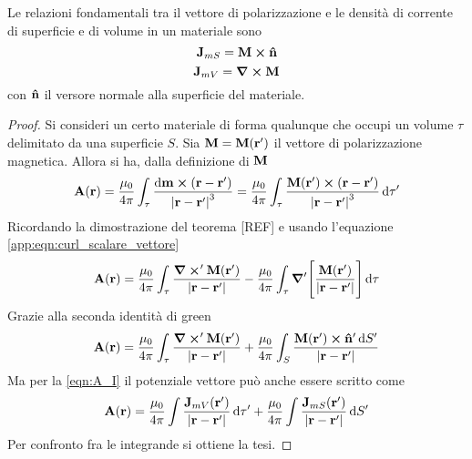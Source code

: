 \begin{thm}
    Le relazioni fondamentali tra il vettore di polarizzazione e le densità di corrente
    di superficie e di volume in un materiale sono
    \begin{equation}
        \vb{J}_{mS}=\vb{M}\cp\vu{n}
        \label{eqn:M_JmS}
    \end{equation}
    \begin{equation}
        \vb{J}_{mV}=\curl{\vb{M}}
        \label{eqn:M_JmV}
    \end{equation}
    con $\vu{n}$ il versore normale alla superficie del materiale.
\end{thm}
\begin{proof}
    Si consideri un certo materiale di forma qualunque che occupi un volume $\tau$ delimitato da una superficie $S$.
    Sia $\vb{M}=\vb{M}(\vb{r}')$ il vettore di polarizzazione magnetica. Allora si ha, dalla definizione di $\vb{M}$
    \[
        \vb{A}(\vb{r})=\frac{\mu_0}{4\pi} \int_{\tau}\frac{\dd{\vb{m}}\cp(\vb{r}-\vb{r'})}{\abs{\vb{r}-\vb{r'}}^3}=
        \frac{\mu_0}{4\pi} \int_{\tau}\frac{\vb{M}(\vb{r'})\cp(\vb{r}-\vb{r'})}{\abs{\vb{r}-\vb{r'}}^3}\dd{\tau'}
    \]
    Ricordando la dimostrazione del teorema [REF] e usando l'equazione \eqref{app:eqn:curl_scalare_vettore}
    \[
        \vb{A}(\vb{r})=\frac{\mu_0}{4\pi} \int_{\tau}\frac{\curl'\vb{M}(\vb{r'})}{\abs{\vb{r}-\vb{r'}}}-
        \frac{\mu_0}{4\pi} \int_{\tau}\grad'\Biggl[\frac{\vb{M}(\vb{r'})}{\abs{\vb{r}-\vb{r'}}}\Biggr]\dd{\tau}
    \]
    Grazie alla seconda identità di green
    \[
        \vb{A}(\vb{r})=\frac{\mu_0}{4\pi} \int_{\tau}\frac{\curl'\vb{M}(\vb{r'})}{\abs{\vb{r}-\vb{r'}}}+
        \frac{\mu_0}{4\pi} \int_{S}\frac{\vb{M}(\vb{r'})\cp\vu{n}'\dd{S'}}{\abs{\vb{r}-\vb{r'}}}
    \]
    Ma per la \ref{eqn:A_I} il potenziale vettore può anche essere scritto come
    \[
        \vb{A}(\vb{r})=\frac{\mu_0}{4\pi}\int\frac{\vb{J}_{mV}(\vb{r}')}{\abs{\vb{r}-\vb{r}'}}\dd{\tau'}+
        \frac{\mu_0}{4\pi}\int\frac{\vb{J}_{mS}(\vb{r}')}{\abs{\vb{r}-\vb{r}'}}\dd{S'}
    \]
    Per confronto fra le integrande si ottiene la tesi.
\end{proof}
